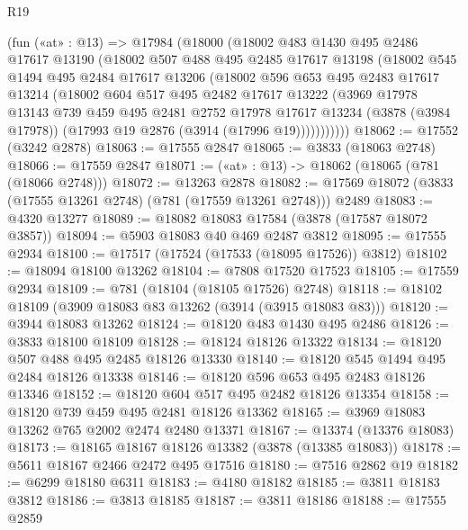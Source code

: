 \begin{lexlean}{R19}
\begin{coremodule}
    (fun («at» : @13) =>
    @17984
      (@18000
        (@18002
          @483
          @1430
          @495
          @2486
          @17617
          @13190
          (@18002
            @507
            @488
            @495
            @2485
            @17617
            @13198
            (@18002
              @545
              @1494
              @495
              @2484
              @17617
              @13206
              (@18002
                @596
                @653
                @495
                @2483
                @17617
                @13214
                (@18002
                  @604
                  @517
                  @495
                  @2482
                  @17617
                  @13222
                  (@3969
                    @17978
                    @13143
                    @739
                    @459
                    @495
                    @2481
                    @2752
                    @17978
                    @17617
                    @13234
                    (@3878 (@3984 @17978))
                    (@17993 @19 @2876 (@3914 (@17996 @19)))))))))))
@18062 := @17552 (@3242 @2878)
@18063 := @17555 @2847
@18065 := @3833 (@18063 @2748)
@18066 := @17559 @2847
@18071 := («at» : @13) -> @18062 (@18065 (@781 (@18066 @2748)))
@18072 := @13263 @2878
@18082 := @17569 @18072 (@3833 (@17555 @13261 @2748) (@781 (@17559 @13261 @2748))) @2489
@18083 := @4320 @13277
@18089 := @18082 @18083 @17584 (@3878 (@17587 @18072 @3857))
@18094 := @5903 @18083 @40 @469 @2487 @3812
@18095 := @17555 @2934
@18100 := @17517 (@17524 (@17533 (@18095 @17526)) @3812)
@18102 := @18094 @18100 @13262
@18104 := @7808 @17520 @17523
@18105 := @17559 @2934
@18109 := @781 (@18104 (@18105 @17526) @2748)
@18118 := @18102 @18109 (@3909 @18083 @83 @13262 (@3914 (@3915 @18083 @83)))
@18120 := @3944 @18083 @13262
@18124 := @18120 @483 @1430 @495 @2486
@18126 := @3833 @18100 @18109
@18128 := @18124 @18126 @13322
@18134 := @18120 @507 @488 @495 @2485 @18126 @13330
@18140 := @18120 @545 @1494 @495 @2484 @18126 @13338
@18146 := @18120 @596 @653 @495 @2483 @18126 @13346
@18152 := @18120 @604 @517 @495 @2482 @18126 @13354
@18158 := @18120 @739 @459 @495 @2481 @18126 @13362
@18165 := @3969 @18083 @13262 @765 @2002 @2474 @2480 @13371
@18167 := @13374 (@13376 @18083)
@18173 := @18165 @18167 @18126 @13382 (@3878 (@13385 @18083))
@18178 := @5611 @18167 @2466 @2472 @495 @17516
@18180 := @7516 @2862 @19
@18182 := @6299 @18180 @6311
@18183 := @4180 @18182
@18185 := @3811 @18183 @3812
@18186 := @3813 @18185
@18187 := @3811 @18186
@18188 := @17555 @2859

\end{coremodule}
\end{lexlean}
